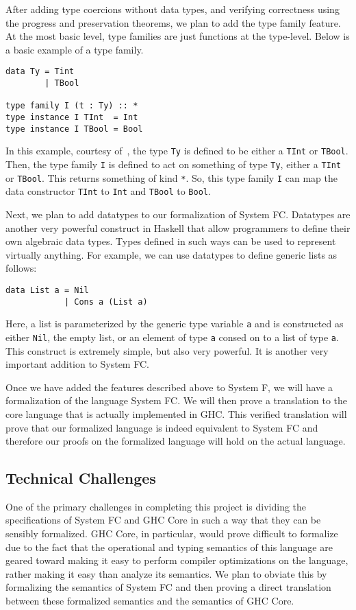 \documentclass{sig-alternate}
\begin{document}
After adding type coercions without data types, and verifying correctness using the progress and preservation theorems, we plan to add the type family feature. At the most basic level, type families are just functions at the type-level. Below is a basic example of a type family.
\begin{verbatim}
data Ty = Tint
        | TBool

type family I (t : Ty) :: *
type instance I TInt  = Int
type instance I TBool = Bool
\end{verbatim}
In this example, courtesy of~\cite{DBLP:conf/icfp/WeirichHE13}, the type \texttt{Ty} is defined to be either a \texttt{TInt} or \texttt{TBool}. Then, the type family \texttt{I} is defined to act on something of type \texttt{Ty}, either a \texttt{TInt} or \texttt{TBool}. This returns something of kind \texttt{*}. So, this type family \texttt{I} can map the data constructor \texttt{TInt} to \texttt{Int} and \texttt{TBool} to \texttt{Bool}.

Next, we plan to add datatypes to our formalization of System FC.  Datatypes are another very powerful construct in Haskell that allow programmers to define their own algebraic data types.  Types defined in such ways can be used to represent virtually anything.  For example, we can use datatypes to define generic lists as follows:
\begin{verbatim}
data List a = Nil
            | Cons a (List a)
\end{verbatim}
Here, a list is parameterized by the generic type variable \texttt{a} and is constructed as either \texttt{Nil}, the empty list, or an element of type \texttt{a} consed on to a list of type \texttt{a}.  This construct is extremely simple, but also very powerful.  It is another very important addition to System FC.

Once we have added the features described above to System F, we will have a formalization of the language System FC.  We will then prove a translation to the core language that is actually implemented in GHC.  This verified translation will prove that our formalized language is indeed equivalent to System FC and therefore our proofs on the formalized language will hold on the actual language.

\subsection{Technical Challenges}
\label{subsec:tech_challenges}
One of the primary challenges in completing this project is dividing the specifications of System FC and GHC Core in such a way that they can be sensibly formalized. GHC Core, in particular, would prove difficult to formalize due to the fact that the operational and typing semantics of this language are geared toward making it easy to perform compiler optimizations on the language, rather making it easy than analyze its semantics. We plan to obviate this by formalizing the semantics of System FC and then proving a direct translation between these formalized semantics and the semantics of GHC Core.
\end{document}
